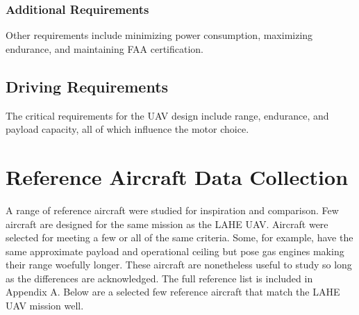 \documentclass[12pt]{article}
\begin{document}
	\subsubsection{Additional Requirements}
	Other requirements include minimizing power consumption, maximizing endurance, and maintaining FAA certification.
	
	\subsection{Driving Requirements}
	The critical requirements for the UAV design include range, endurance, and payload capacity, all of which influence the motor choice.
	
	\section{Reference Aircraft Data Collection}
	A range of reference aircraft were studied for inspiration and comparison. Few aircraft are designed for the same mission as the LAHE UAV. Aircraft were selected for meeting a few or all of the same criteria. Some, for example, have the same approximate payload and operational ceiling but pose gas engines making their range woefully longer. These aircraft are nonetheless useful to study so long as the differences are acknowledged. The full reference list is included in Appendix A. Below are a selected few reference aircraft that match the LAHE UAV mission well.
	\newpage
\end{document}
